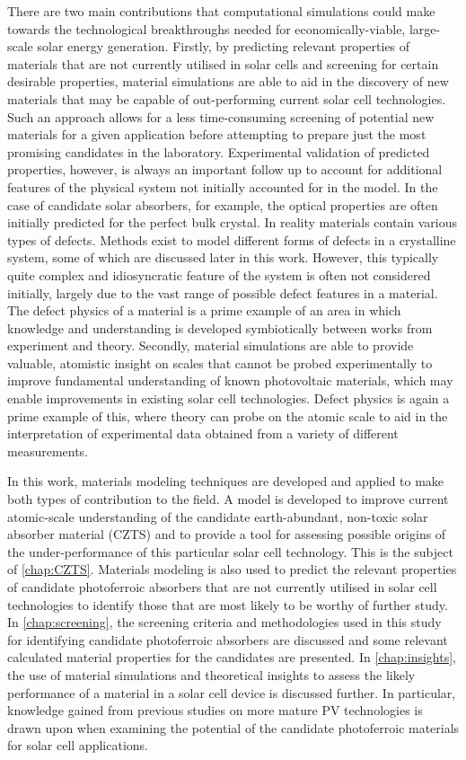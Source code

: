 \documentclass[11pt, twoside]{report}
\begin{document}
There are two main contributions that computational simulations could make towards the technological breakthroughs needed for economically-viable, large-scale solar energy generation. Firstly, by predicting relevant properties of materials that are not currently utilised in solar cells and screening for certain desirable properties, material simulations are able to aid in the discovery of new materials that may be capable of out-performing current solar cell technologies. Such an approach allows for a less time-consuming screening of potential new materials for a given application before attempting to prepare just the most promising candidates in the laboratory. Experimental validation of predicted properties, however, is always an important follow up to account for additional features of the physical system not initially accounted for in the model. In the case of candidate solar absorbers, for example, the optical properties are often initially predicted for the perfect bulk crystal. In reality materials contain various types of defects. Methods exist to model different forms of defects in a crystalline system, some of which are discussed later in this work. However, this typically quite complex and idiosyncratic feature of the system is often not considered initially, largely due to the vast range of possible defect features in a material. The defect physics of a material is a prime example of an area in which knowledge and understanding is developed symbiotically between works from experiment and theory. Secondly, material simulations are able to provide valuable, atomistic insight on scales that cannot be probed experimentally to improve fundamental understanding of known photovoltaic materials, which may enable improvements in existing solar cell technologies. Defect physics is again a prime example of this, where theory can probe on the atomic scale to aid in the interpretation of experimental data obtained from a variety of different measurements.

In this work, materials modeling techniques are developed and applied to make both types of contribution to the field. A model is developed to improve current atomic-scale understanding of the candidate earth-abundant, non-toxic solar absorber material {\CZTS} (CZTS) and to provide a tool for assessing possible origins of the under-performance of this particular solar cell technology. This is the subject of \autoref{chap:CZTS}. Materials modeling is also used to predict the relevant properties of candidate photoferroic absorbers that are not currently utilised in solar cell technologies to identify those that are most likely to be worthy of further study. In \autoref{chap:screening}, the screening criteria and methodologies used in this study for identifying candidate photoferroic absorbers are discussed and some relevant calculated material properties for the candidates are presented. In \autoref{chap:insights}, the use of material simulations and theoretical insights to assess the likely performance of a material in a solar cell device is discussed further. In particular, knowledge gained from previous studies on more mature PV technologies is drawn upon when examining the potential of the candidate photoferroic materials for solar cell applications.
\end{document}
